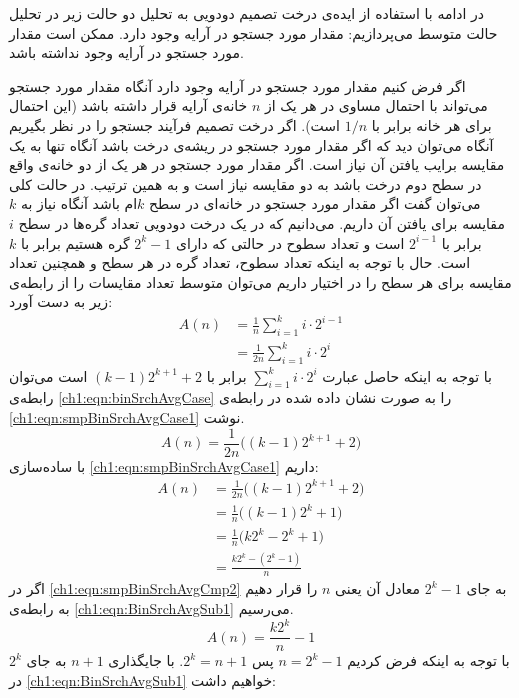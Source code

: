 {در ادامه با استفاده از ایده‌ی درخت‌ تصمیم دودویی به تحلیل دو حالت زیر در تحلیل حالت متوسط می‌پردازیم:
 مقدار مورد جستجو در آرایه وجود دارد.
 ممکن است مقدار مورد جستجو در آرایه وجود نداشته باشد.

اگر فرض کنیم مقدار مورد جستجو در آرایه وجود دارد آنگاه مقدار مورد جستجو می‌تواند با احتمال مساوی در هر یک از {$n$} خانه‌ی آرایه قرار داشته باشد (این احتمال برای هر خانه برابر با {$1/n$} است). اگر درخت تصمیم فرآیند جستجو را در نظر بگیریم آنگاه می‌توان دید که اگر مقدار مورد جستجو در ریشه‌ی درخت باشد آنگاه تنها به یک مقایسه برایب یافتن آن نیاز است. اگر مقدار مورد جستجو در هر یک از دو خانه‌ی واقع در سطح دوم درخت باشد به دو مقایسه نیاز است و به همین ترتیب. در حالت کلی می‌توان گفت اگر مقدار مورد جستجو در خانه‌ای در سطح {$k$}ام باشد آنگاه نیاز به {$k$} مقایسه برای یافتن آن داریم. می‌دانیم که در یک درخت دودویی تعداد گره‌ها در سطح {$i$} برابر با {$2^{i-1}$} است و تعداد سطوح در حالتی که دارای {$2^{k}-1$} گره هستیم برابر با {$k$}  است. حال با توجه به اینکه تعداد سطوح، تعداد گره در هر سطح و همچنین تعداد مقایسه برای هر سطح را در اختیار داریم می‌توان متوسط تعداد مقایسات را از رابطه‌ی زیر به دست آورد:
\begin{align}
A(n) &= \frac{1}{n} \sum_{i=1}^{k}{i \cdot 2^{i-1}}\nonumber\\
&= \frac{1}{2n}\sum_{i=1}^{k}{i \cdot 2^{i}}\label{ch1:eqn:binSrchAvgCase}
\end{align}
با توجه به اینکه حاصل عبارت {$\sum_{i=1}^{k}{i \cdot 2^{i}}$} برابر با {$(k-1)2^{k+1} + 2$} است می‌توان رابطه‌ی {\eqref{ch1:eqn:binSrchAvgCase}} را به صورت نشان داده شده در رابطه‌ی {\eqref{ch1:eqn:smpBinSrchAvgCase1}} نوشت.
\begin{equation}
A(n)=\frac{1}{2n}\biggl( (k-1)2^{k+1} + 2 \biggr)\label{ch1:eqn:smpBinSrchAvgCase1}
\end{equation}
با ساده‌سازی {\eqref{ch1:eqn:smpBinSrchAvgCase1}} داریم:
\begin{align}
A(n) &= \frac{1}{2n}\biggl( (k-1)2^{k+1} + 2 \biggr) \nonumber\\
&= \frac{1}{n}\biggl( (k-1)2^{k} + 1 \biggr) \nonumber\\
&= \frac{1}{n}\biggl( k2^{k} -2^{k}  + 1 \biggr) \nonumber\\
&= \frac{k2^{k} - (2^{k}-1)}{n}\label{ch1:eqn:smpBinSrchAvgCmp2}
\end{align}
اگر در {\eqref{ch1:eqn:smpBinSrchAvgCmp2}} به جای {$2^{k}-1$} معادل آن یعنی {$n$} را قرار دهیم به رابطه‌ی {\eqref{ch1:eqn:BinSrchAvgSub1}} می‌رسیم.
\begin{equation}
A(n)=\frac{k2^{k}}{n} - 1\label{ch1:eqn:BinSrchAvgSub1}
\end{equation}
با توجه به اینکه فرض کردیم {$n=2^{k}-1$} پس {$2^k=n+1$}. با جایگذاری {$n+1$} به جای {$2^k$} در {\eqref{ch1:eqn:BinSrchAvgSub1}} خواهیم داشت:

}
